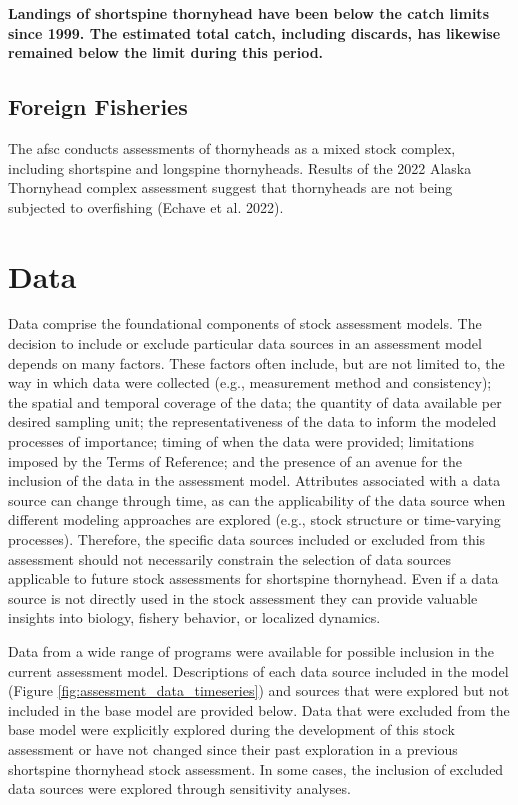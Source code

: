 \documentclass[11pt,
  english,
  letterpaper,
]{article}
\begin{document}
\textbf{Landings of shortspine thornyhead have been below the catch limits since 1999. The estimated total catch, including discards, has likewise remained below the limit during this period.}

\hypertarget{foreign-fisheries}{%
\subsection{Foreign Fisheries}\label{foreign-fisheries}}

The \gls{afsc} conducts assessments of thornyheads as a mixed stock complex, including shortspine and longspine thornyheads. Results of the 2022 Alaska Thornyhead complex assessment suggest that thornyheads are not being subjected to overfishing (Echave et al. 2022).

\hypertarget{data}{%
\section{Data}\label{data}}

Data comprise the foundational components of stock assessment models. The decision to include or exclude particular data sources in an assessment model depends on many factors. These factors often include, but are not limited to, the way in which data were collected (e.g., measurement method and consistency); the spatial and temporal coverage of the data; the quantity of data available per desired sampling unit; the representativeness of the data to inform the modeled processes of importance; timing of when the data were provided; limitations imposed by the Terms of Reference; and the presence of an avenue for the inclusion of the data in the assessment model. Attributes associated with a data source can change through time, as can the applicability of the data source when different modeling approaches are explored (e.g., stock structure or time-varying processes). Therefore, the specific data sources included or excluded from this assessment should not necessarily constrain the selection of data sources applicable to future stock assessments for shortspine thornyhead. Even if a data source is not directly used in the stock assessment they can provide valuable insights into biology, fishery behavior, or localized dynamics.

Data from a wide range of programs were available for possible inclusion in the current assessment model. Descriptions of each data source included in the model (Figure \ref{fig:assessment_data_timeseries}) and sources that were explored but not included in the base model are provided below. Data that were excluded from the base model were explicitly explored during the development of this stock assessment or have not changed since their past exploration in a previous shortspine thornyhead stock assessment. In some cases, the inclusion of excluded data sources were explored through sensitivity analyses.
\end{document}
